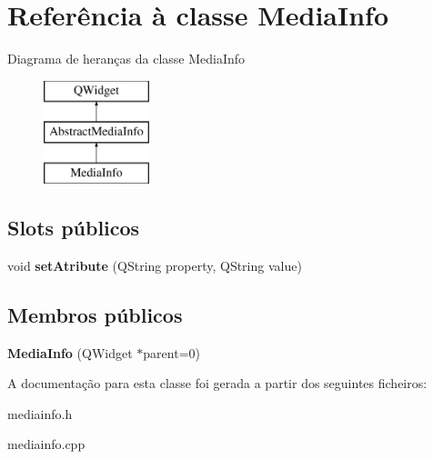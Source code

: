 \hypertarget{class_media_info}{\section{Referência à classe Media\-Info}
\label{class_media_info}
}
Diagrama de heranças da classe Media\-Info\begin{figure}[H]
\begin{center}
\leavevmode
\includegraphics[height=3.000000cm]{class_media_info}
\end{center}
\end{figure}
\subsection*{Slots públicos}
\begin{DoxyCompactItemize}
\item 
\hypertarget{class_media_info_ac1a807582e0830e8f7a6167257a8b69a}{void {\bfseries set\-Atribute} (Q\-String property, Q\-String value)}\label{class_media_info_ac1a807582e0830e8f7a6167257a8b69a}

\end{DoxyCompactItemize}
\subsection*{Membros públicos}
\begin{DoxyCompactItemize}
\item 
\hypertarget{class_media_info_a80b7af5a999c7ab31e4207c39ccb8833}{{\bfseries Media\-Info} (Q\-Widget $\ast$parent=0)}\label{class_media_info_a80b7af5a999c7ab31e4207c39ccb8833}

\end{DoxyCompactItemize}


A documentação para esta classe foi gerada a partir dos seguintes ficheiros\-:\begin{DoxyCompactItemize}
\item 
mediainfo.\-h\item 
mediainfo.\-cpp\end{DoxyCompactItemize}
